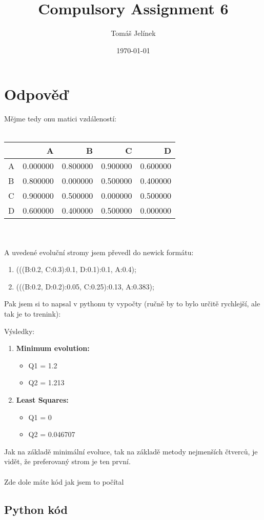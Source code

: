 \documentclass{article}
\title{Compulsory Assignment 6}
\author{Tomáš Jelínek}
\date{\today}
\begin{document}
\maketitle

\section*{Odpověď}

Mějme tedy onu matici vzdáleností:
\\
\\
\begin{tabular}{lrrrr}
    \toprule
     & A & B & C & D \\
    \midrule
    A & 0.000000 & 0.800000 & 0.900000 & 0.600000 \\
    B & 0.800000 & 0.000000 & 0.500000 & 0.400000 \\
    C & 0.900000 & 0.500000 & 0.000000 & 0.500000 \\
    D & 0.600000 & 0.400000 & 0.500000 & 0.000000 \\
    \bottomrule
\end{tabular}
\\
\\
A uvedené evoluční stromy jsem převedl do newick formátu:
\begin{enumerate}
    \item (((B:0.2, C:0.3):0.1, D:0.1):0.1, A:0.4);
    \item (((B:0.2, D:0.2):0.05, C:0.25):0.13, A:0.383);
\end{enumerate}

Pak jsem si to napsal v pythonu ty vypočty (ručně by to bylo určitě rychlejší, ale tak je to trenink):

Výsledky:
\begin{enumerate}
    \item \textbf{Minimum evolution:}
    \begin{itemize}
        \item Q1 = 1.2
        \item Q2 = 1.213
    \end{itemize}
    \item \textbf{Least Squares:}
    \begin{itemize}
        \item Q1 = 0
        \item Q2 = 0.046707
    \end{itemize}
\end{enumerate}

Jak na základě minimální evoluce, tak na základě metody nejmenších čtverců, je vidět, že preferovaný strom je ten první.
\\
\\
Zde dole máte kód jak jsem to počítal

\subsection*{Python kód}


\end{document}
